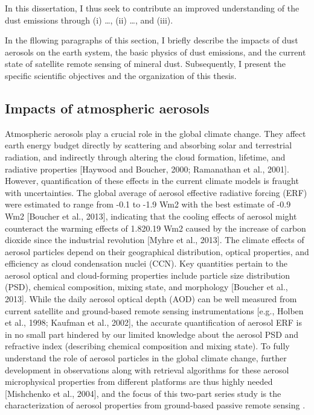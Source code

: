  In this dissertation, I thus seek to contribute an improved understanding 
 of the dust emissions through (i) \ldots, (ii) \ldots, and (iii).

 In the fllowing paragraphs of this section, 
 I briefly describe the impacts of dust aerosols on the earth system, 
 the basic physics of dust emissions, 
 and the current state of satellite remote sensing of mineral dust. 
 Subsequently, I present the specific scientific objectives and the 
 organization of this thesis.  

\subsection{Impacts of atmospheric aerosols}

Atmospheric aerosols play a crucial role in the global 
climate change. They affect earth energy budget directly 
by scattering and absorbing solar and terrestrial radiation, 
and indirectly through altering the cloud formation, 
lifetime, and radiative properties [Haywood and Boucher, 
2000; Ramanathan et al., 2001]. However, quantification of 
these effects in the current climate models is fraught with 
uncertainties. The global average of aerosol effective 
radiative forcing (ERF) were estimated to range from -0.1 
to -1.9 Wm2 with the best estimate of -0.9 Wm2 [Boucher et 
al., 2013], indicating that the cooling effects of aerosol 
might counteract the warming effects of 1.820.19 Wm2 caused
by the increase of carbon dioxide since the industrial 
revolution [Myhre et al., 2013]. The climate effects of 
aerosol particles depend on their geographical distribution, 
optical properties, and efficiency as cloud condensation 
nuclei (CCN). Key quantities pertain to the aerosol optical 
and cloud-forming properties include particle size 
distribution (PSD), chemical composition, mixing state, and 
morphology [Boucher et al., 2013]. While the daily aerosol 
optical depth (AOD) can be well measured from current 
satellite and ground-based remote sensing instrumentations 
[e.g., Holben et al., 1998; Kaufman et al., 2002], the 
accurate quantification of aerosol ERF is in no small part 
hindered by our limited knowledge about the aerosol PSD and 
refractive index (describing chemical composition and 
mixing state). To fully understand the role of aerosol 
particles in the global climate change, further development 
in observations along with retrieval algorithms for these 
aerosol microphysical properties from different platforms 
are thus highly needed [Mishchenko et al., 2004], and 
the focus of this two-part series study is the 
characterization of aerosol properties from ground-based 
passive remote sensing \citep{henze07}. 

